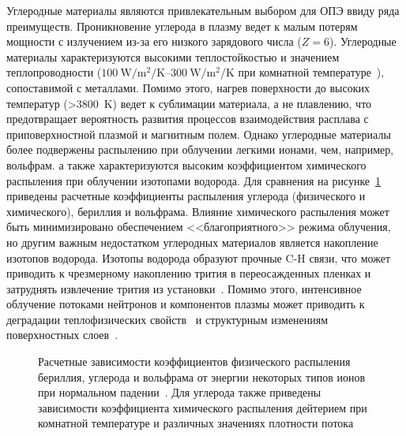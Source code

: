 Углеродные материалы являются привлекательным выбором для ОПЭ ввиду ряда преимуществ. Проникновение углерода в плазму ведет к малым потерям мощности с излучением из-за его низкого зарядового числа ($Z=6$). Углеродные материалы характеризуются высокими теплостойкостью и значением теплопроводности ($\SIrange{100}{300}{\watt\per\meter\squared\per\kelvin}$ при комнатной температуре~\cite{Merola2004, Begrambekov2023}), сопоставимой с металлами. Помимо этого, нагрев поверхности до высоких температур (>\SI{3800}{\kelvin}) ведет к сублимации материала, а не плавлению, что предотвращает вероятность развития процессов взаимодействия расплава с приповерхностной плазмой и магнитным полем. Однако углеродные материалы более подвержены распылению при облучении легкими ионами, чем, например, вольфрам. а также характеризуются высоким коэффициентом химического распыления при облучении изотопами водорода. Для сравнения на рисунке~\cref{fig:ch1/sputerring_yields} приведены расчетные коэффициенты распыления углерода (физического и химического), бериллия и вольфрама. Влияние химического распыления может быть минимизировано обеспечением <<благоприятного>> режима облучения, но другим важным недостатком углеродных материалов является накопление изотопов водорода. Изотопы водорода образуют прочные C-H связи, что может приводить к чрезмерному накоплению трития в переосажденных пленках и затруднять извлечение трития из установки~\cite{Gasparyan2024}. Помимо этого, интенсивное облучение потоками нейтронов и компонентов плазмы может приводить к деградации теплофизических свойств~\cite{Wu1994} и структурным изменениям поверхностных слоев~\cite{Wang2018,Begrambekov2019,Seyedhabashi2025}.

\begin{figure}[ht]
    \caption{Расчетные зависимости коэффициентов физического распыления бериллия, углерода и вольфрама от энергии некоторых типов ионов при нормальном падении~\cite{international2001iaea, behrisch_2025}. Для углерода также приведены зависимости коэффициента химического распыления дейтерием при комнатной температуре и различных значениях плотности потока~\cite{Roth1999,Roth2004}}\label{fig:ch1/sputerring_yields}
\end{figure}

